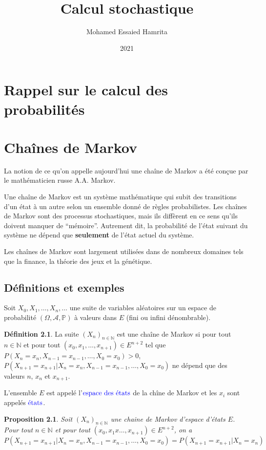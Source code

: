 \documentclass[
]{book}
\title{Calcul stochastique}
\author{Mohamed Essaied Hamrita}
\date{2021}
\newtheorem{proposition}{Proposition}[chapter]
\theoremstyle{definition}
\newtheorem{definition}{Définition}[chapter]
\theoremstyle{definition}
\theoremstyle{definition}
\theoremstyle{remark}
\begin{document}
\maketitle

{
\setcounter{tocdepth}{1}
\tableofcontents
}
\hypertarget{rappel-sur-le-calcul-des-probabilituxe9s}{%
\chapter{Rappel sur le calcul des probabilités}\label{rappel-sur-le-calcul-des-probabilituxe9s}}

\hypertarget{chauxeenes-de-markov}{%
\chapter{Chaînes de Markov}\label{chauxeenes-de-markov}}

La notion de ce qu'on appelle aujourd'hui une chaîne de Markov a été conçue par le mathématicien russe A.A. Markov.

Une chaîne de Markov est un système mathématique qui subit des transitions d'un état à un autre selon un ensemble donné de règles probabilistes. Les chaînes de Markov sont des processus stochastiques, mais ils diffèrent en ce sens qu'ils doivent manquer de ``mémoire''. Autrement dit, la probabilité de l'état suivant du système ne dépend que \textbf{seulement} de l'état actuel du système.

Les chaînes de Markov sont largement utilisées dans de nombreux domaines tels que la finance, la théorie des jeux et la génétique.

\hypertarget{duxe9finitions-et-exemples}{%
\section{Définitions et exemples}\label{duxe9finitions-et-exemples}}

Soit \(X_0, X_1,\ldots, X_n, \ldots\) une suite de variables aléatoires sur un espace de probabilité \((\Omega,\mathcal{A}, \mathbb{P})\) à valeurs dans \(E\) (fini ou infini dénombrable).

\begin{definition}
\protect\hypertarget{def:unnamed-chunk-3}{}{\label{def:unnamed-chunk-3} }La suite \((X_n)_{n \in \mathbb{N}}\) est une chaîne de Markov si pour tout \(n \in \mathbb{N}\) et pour tout \((x_0,x_1, \ldots,x_{n+1}) \in E^{n+2}\) tel que \(P(X_n=x_n, X_{n-1}=x_{n-1},\ldots, X_0=x_0) >0\), \(P(X_{n+1}=x_{n+1}|X_n=x_n,X_{n-1}=x_{n-1},\ldots, X_0=x_0)\) ne dépend que des valeurs \(n\), \(x_n\) et \(x_{n+1}\).
\end{definition}
L'ensemble \(E\) est appelé l'\(\color{blue}{\mathbf{\text{espace des états}}}\) de la chîne de Markov et les \(x_i\) sont appelés \(\color{blue}{\mathbf{\text{états}}}\).
\begin{proposition}
\protect\hypertarget{prp:unnamed-chunk-4}{}{\label{prp:unnamed-chunk-4} }Soit \((X_n)_{n \in \mathbb{N}}\) une chaine de Markov d'espace d'états \(E\). Pour tout \(n \in \mathbb{N}\) et pour tout \((x_0,x_1x\ldots,x_{n+1})\in E^{n+2}\), on a
\[P(X_{n+1}=x_{n+1}|X_n=x_n,X_{n-1}=x_{n-1},\ldots, X_0=x_0)=P(X_{n+1}=x_{n+1}|X_n=x_n)\]
\end{proposition}
\end{document}
